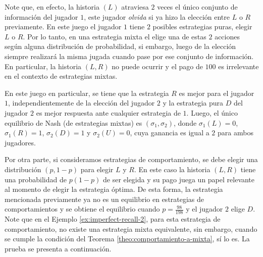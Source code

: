 Note que, en efecto, la historia $(L)$ atraviesa $2$ veces el único conjunto de información del jugador $1$, este jugador \textit{olvida} si ya hizo la elección entre $L$ o $R$ previamente. En este juego el jugador $1$ tiene $2$ posibles estrategias puras, elegir $L$ o $R$. Por lo tanto, en una estrategia mixta el elige una de estas $2$ acciones según alguna distribución de probabilidad, si embargo, luego de la elección siempre realizará la misma jugada cuando pase por ese conjunto de información. En particular, la historia $(L, R)$ no puede ocurrir y el pago de $100$ es irrelevante en el contexto de estrategias mixtas.

En este juego en particular, se tiene que la estrategia $R$ es mejor para el jugador $1$, independientemente de la elección del jugador $2$ y la estrategia pura $D$ del jugador $2$ es mejor respuesta ante cualquier estrategia de $1$. Luego, el único equilibrio de Nash (de estrategias mixtas) es $(\sigma_1, \sigma_2)$, donde $\sigma_1(L) = 0$, $\sigma_1(R) = 1$, $\sigma_2(D) = 1$ y $\sigma_2(U) = 0$, cuya ganancia es igual a $2$ para ambos jugadores.

Por otra parte, si consideramos estrategias de comportamiento, se debe elegir una distribución $(p, 1-p)$ para elegir $L$ y $R$. En este caso la historia $(L, R)$ tiene una probabilidad de $p(1-p)$ de ser elegida y su pago juega un papel relevante al momento de elegir la estrategia óptima. De esta forma, la estrategia mencionada previamente ya no es un equilibrio en estrategias de comportamientos y se obtiene el equilibrio cuando $p = \frac{98}{198}$ y el jugador $2$ elige $D$.
Note que en el Ejemplo \ref{ex:imperfect-recall-2}, para esta estrategia de comportamiento, no existe una estrategia mixta equivalente, sin embargo, cuando se cumple la condición del Teorema \ref{theo:comportamiento-a-mixta}, sí lo es. La prueba se presenta a continuación.

